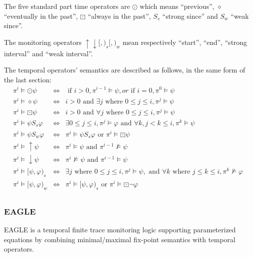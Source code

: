 The five standard part time operators are $\odot $ which means ``previous'', $\diamond$ ``eventually in the past'', $\boxdot$ ``always in the past'', $\mathrel{S_s}$ ``strong since'' and $\mathrel{S_w}$ ``weak since''.

The monitoring operators $\uparrow \downarrow [,)_s [,)_w$ mean respectively ``start'', ``end'', ``strong  interval'' and ``weak  interval''.

The temporal operators' semantics are described as follows, in the same form of the last section:
\begin{eqnarray*}
\pi^i \vDash \odot \psi & \iff & \mbox{ if } i > 0, \pi^{i - 1} \vDash \psi, or \mbox{ if } i = 0, \pi^0 \vDash \psi \\
\pi^i \vDash \diamond \psi & \iff & i > 0 \mbox{ and } \exists j \mbox{ where } 0 \leq j \leq i, \pi^j \vDash \psi \\
\pi^i \vDash \boxdot \psi & \iff & i > 0 \mbox{ and } \forall j \mbox{ where } 0 \leq j \leq i, \pi^j \vDash \psi \\
\pi^i \vDash \psi \mathrel{S_s} \varphi & \iff & \exists 0 \leq j \leq i, \pi^j \vDash \varphi \mbox{ and } \forall k, j < k \leq i, \pi^k \vDash \psi \\
\pi^i \vDash \psi \mathrel{S_w} \varphi & \iff & \pi^i \vDash \psi \mathrel{S_s} \varphi \mbox{ or } \pi^i \vDash \boxdot\psi \\
\pi^i \vDash \uparrow \psi & \iff & \pi^i \vDash \psi \mbox{ and } \pi^{i - 1} \nvDash \psi \\
\pi^i \vDash \downarrow \psi & \iff & \pi^i \nvDash \psi \mbox{ and } \pi^{i - 1} \vDash \psi \\
\pi^i \vDash [\psi, \varphi)_s & \iff & \exists j \mbox{ where } 0 \leq j \leq i, \pi^j \vDash \psi, \mbox{ and } \forall k \mbox{ where } j \leq k \leq i, \pi^k \nvDash \varphi \\
\pi^i \vDash [\psi, \varphi)_w & \iff & \pi^i \vDash [\psi, \varphi)_s \mbox{ or } \pi^i \vDash \boxdot\neg\varphi \\
\end{eqnarray*}

\subsubsection{EAGLE}

EAGLE \citep{barringer2004rule} is a temporal finite trace monitoring logic supporting parameterized equations by combining minimal/maximal fix-point semantics with temporal operators.


